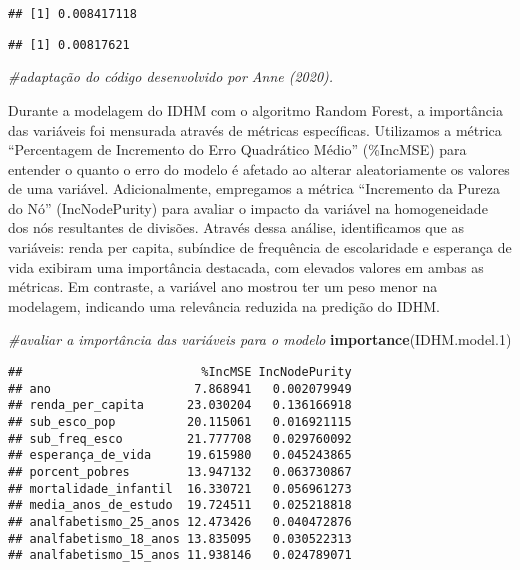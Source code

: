 \documentclass[
]{article}
\newenvironment{Shaded}{\begin{snugshade}}{\end{snugshade}}
\newcommand{\CommentTok}[1]{\textcolor[rgb]{0.56,0.35,0.01}{\textit{#1}}}
\newcommand{\FloatTok}[1]{\textcolor[rgb]{0.00,0.00,0.81}{#1}}
\newcommand{\FunctionTok}[1]{\textcolor[rgb]{0.13,0.29,0.53}{\textbf{#1}}}
\newcommand{\NormalTok}[1]{#1}
\newcommand{\SpecialCharTok}[1]{\textcolor[rgb]{0.81,0.36,0.00}{\textbf{#1}}}
\begin{document}
\begin{verbatim}
## [1] 0.008417118
\end{verbatim}

\begin{Shaded}
\end{Shaded}

\begin{verbatim}
## [1] 0.00817621
\end{verbatim}

\begin{Shaded}
\begin{Highlighting}[]
\CommentTok{\#adaptação do código desenvolvido por Anne (2020).}
\end{Highlighting}
\end{Shaded}

Durante a modelagem do IDHM com o algoritmo Random Forest, a importância
das variáveis foi mensurada através de métricas específicas. Utilizamos
a métrica ``Percentagem de Incremento do Erro Quadrático Médio''
(\%IncMSE) para entender o quanto o erro do modelo é afetado ao alterar
aleatoriamente os valores de uma variável. Adicionalmente, empregamos a
métrica ``Incremento da Pureza do Nó'' (IncNodePurity) para avaliar o
impacto da variável na homogeneidade dos nós resultantes de divisões.
Através dessa análise, identificamos que as variáveis: renda per capita,
subíndice de frequência de escolaridade e esperança de vida exibiram uma
importância destacada, com elevados valores em ambas as métricas. Em
contraste, a variável ano mostrou ter um peso menor na modelagem,
indicando uma relevância reduzida na predição do IDHM.

\begin{Shaded}
\begin{Highlighting}[]
\CommentTok{\#avaliar a importância das variáveis para o modelo }
\FunctionTok{importance}\NormalTok{(IDHM.model}\FloatTok{.1}\NormalTok{)}
\end{Highlighting}
\end{Shaded}

\begin{verbatim}
##                         %IncMSE IncNodePurity
## ano                    7.868941   0.002079949
## renda_per_capita      23.030204   0.136166918
## sub_esco_pop          20.115061   0.016921115
## sub_freq_esco         21.777708   0.029760092
## esperança_de_vida     19.615980   0.045243865
## porcent_pobres        13.947132   0.063730867
## mortalidade_infantil  16.330721   0.056961273
## media_anos_de_estudo  19.724511   0.025218818
## analfabetismo_25_anos 12.473426   0.040472876
## analfabetismo_18_anos 13.835095   0.030522313
## analfabetismo_15_anos 11.938146   0.024789071
\end{verbatim}
\end{document}

